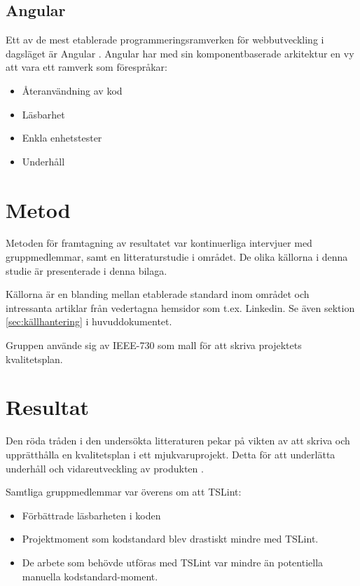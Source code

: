 \subsection{Angular}
Ett av de mest etablerade programmeringsramverken för webbutveckling i dagsläget är Angular \cite{altexsoft}. Angular har med sin komponentbaserade arkitektur en vy att vara ett ramverk som förespråkar:

\begin{itemize}
	\item Återanvändning av kod
	\item Läsbarhet
	\item Enkla enhetstester
	\item Underhåll
\end{itemize}

\section{Metod}

Metoden för framtagning av resultatet var kontinuerliga intervjuer med gruppmedlemmar, samt en litteraturstudie i området. De olika källorna i denna studie är presenterade i denna bilaga.

Källorna är en blanding mellan etablerade standard inom området och intressanta artiklar från vedertagna hemsidor som t.ex. Linkedin. Se även sektion \ref{sec:källhantering} i huvuddokumentet.

Gruppen använde sig av IEEE-730 som mall för att skriva projektets kvalitetsplan.
\clearpage
\section{Resultat}

Den röda tråden i den undersökta litteraturen pekar på vikten av att skriva och upprätthålla en kvalitetsplan i ett mjukvaruprojekt. Detta för att underlätta underhåll och vidareutveckling av produkten \cite{LCA}\cite{sustainable}\cite{ISOtor}\cite{altexsoft}. 

Samtliga gruppmedlemmar var överens om att TSLint:

\begin{itemize}
	\item Förbättrade läsbarheten i koden
	\item Projektmoment som kodstandard blev drastiskt mindre med TSLint.
	\item De arbete som behövde utföras med TSLint var mindre än potentiella manuella kodstandard-moment.
\end{itemize}

